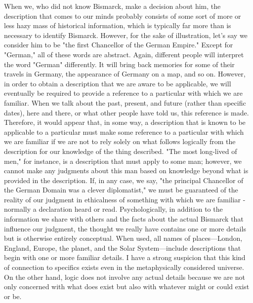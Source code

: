 \documentclass[a4paper,12pt]{book}[2004/02/16]
\theoremstyle{ilemma}
\theoremstyle{itheorem}
\theoremstyle{iother}
\theoremstyle{icorollary}
\theoremstyle{numcorollary}
\theoremstyle{idefinition}
\begin{document}
When we, who did not know Bismarck, make a decision about him, the description that comes to our minds probably consists of some sort of more or less hazy mass of historical information, which is typically far more than is necessary to identify Bismarck. However, for the sake of illustration, let's say we consider him to be "the first Chancellor of the German Empire." Except for "German," all of these words are abstract. Again, different people will interpret the word "German" differently. It will bring back memories for some of their travels in Germany, the appearance of Germany on a map, and so on.
However, in order to obtain a description that we are aware to be applicable, we will eventually be required to provide a reference to a particular with which we are familiar. When we talk about the past, present, and future (rather than specific dates), here and there, or what other people have told us, this reference is made. Therefore, it would appear that, in some way, a description that is known to be applicable to a particular must make some reference to a particular with which we are familiar if we are not to rely solely on what follows logically from the description for our knowledge of the thing described. "The most long-lived of men," for instance, is a description that must apply to some man; however, we cannot make any judgments about this man based on knowledge beyond what is provided in the description. If, in any case, we say, "the principal Chancellor of the
German Domain was a clever diplomatist," we must be guaranteed of
the reality of our judgment in ethicalness of something with which we are
familiar - normally a declaration heard or read. Psychologically, in addition to the information we share with others and the facts about the actual Bismarck that influence our judgment, the thought we really have contains one or more details but is otherwise entirely conceptual. When used, all names of places—London, England, Europe, the planet, and the Solar System—include descriptions that begin with one or more familiar details. I have a strong suspicion that this kind of connection to specifics exists even in the metaphysically considered universe. On the other hand, logic does not involve any actual details because we are not only concerned with what does exist but also with whatever might or could exist or be.
\end{document}
